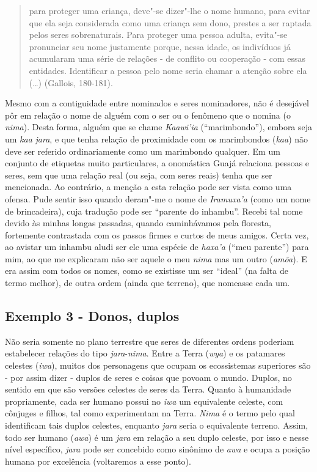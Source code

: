 \begin{quote}
para proteger uma criança, deve"-se dizer"-lhe o nome humano, para evitar
que ela seja considerada como uma criança sem dono, prestes a ser
raptada pelos seres sobrenaturais. Para proteger uma pessoa adulta,
evita"-se pronunciar seu nome justamente porque, nessa idade, os
indivíduos já acumularam uma série de relações - de conflito ou
cooperação - com essas entidades. Identificar a pessoa pelo nome seria
chamar a atenção sobre ela (\ldots{}) (Gallois, 180-181).
\end{quote}

Mesmo com a contiguidade entre nominados e seres nominadores, não é
desejável pôr em relação o nome de alguém com o ser ou o fenômeno que o
nomina (o \emph{nima}). Desta forma, alguém que se chame \emph{Kaawi'ia}
(``marimbondo''), embora seja um \emph{kaa} \emph{jara}, e que tenha
relação de proximidade com os marimbondos (\emph{kaa}) não deve ser
referido ordinariamente como um marimbondo qualquer. Em um conjunto de
etiquetas muito particulares, a onomástica Guajá relaciona pessoas e
seres, sem que uma relação real (ou seja, com seres reais) tenha que ser
mencionada. Ao contrário, a menção a esta relação pode ser vista como
uma ofensa. Pude sentir isso quando deram"-me o nome de \emph{Iramuxa'a}
(como um nome de brincadeira), cuja tradução pode ser ``parente do
inhambu''. Recebi tal nome devido às minhas longas passadas, quando
caminhávamos pela floresta, fortemente contrastada com os passos firmes
e curtos de meus amigos. Certa vez, ao avistar um inhambu aludi ser ele
uma espécie de \emph{haxa'a} (``meu parente'') para mim, ao que me
explicaram não ser aquele o meu \emph{nima} mas um outro (\emph{amõa}).
E era assim com todos os nomes, como se existisse um ser ``ideal'' (na
falta de termo melhor), de outra ordem (ainda que terreno), que nomeasse
cada um.

\subsection{Exemplo 3 - Donos, duplos}

Não seria somente no plano terrestre que seres de diferentes ordens
poderiam estabelecer relações do tipo \emph{jara}-\emph{nima}. Entre a
Terra (\emph{wya}) e os patamares celestes (\emph{iwa}), muitos dos
personagens que ocupam os ecossistemas superiores são - por assim dizer
- duplos de seres e coisas que povoam o mundo. Duplos, no sentido em que
são versões celestes de seres da Terra. Quanto à humanidade
propriamente, cada ser humano possui no \emph{iwa} um equivalente
celeste, com cônjuges e filhos, tal como experimentam na Terra.
\emph{Nima} é o termo pelo qual identificam tais duplos celestes,
enquanto \emph{jara} seria o equivalente terreno. Assim, todo ser humano
(\emph{awa}) é um \emph{jara} em relação a seu duplo celeste, por isso e
nesse nível específico, \emph{jara} pode ser concebido como sinônimo de
\emph{awa} e ocupa a posição humana por excelência (voltaremos a esse
ponto).

